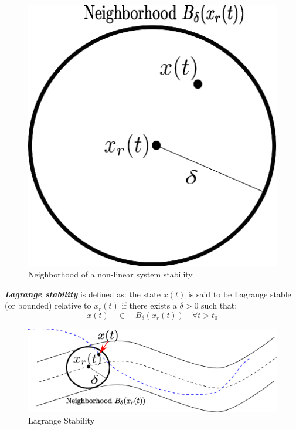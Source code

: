 \begin{figure}[h!]
	\centering
	\includegraphics[scale=0.5]{Bilder/Neighborhood.eps}
	\caption{Neighborhood of a non-linear system stability}
	\label{fig:Neighborhood}
\end{figure}

\textbf{\textit{Lagrange stability}} is defined as: the state $x(t)$ is said to be Lagrange stable (or bounded) relative to $x_r(t)$ if there exists a $\delta > 0$ such that:
\begin{equation}
x(t) \quad \in \quad B_{\delta}(x_r(t)) \quad \forall t > t_0
\end{equation}

\begin{figure}[h!]
	\centering
	\includegraphics[scale=0.5]{Bilder/LagrangeStability.eps}
	\caption{Lagrange Stability}
	\label{fig:LagrangeStability}
\end{figure}

